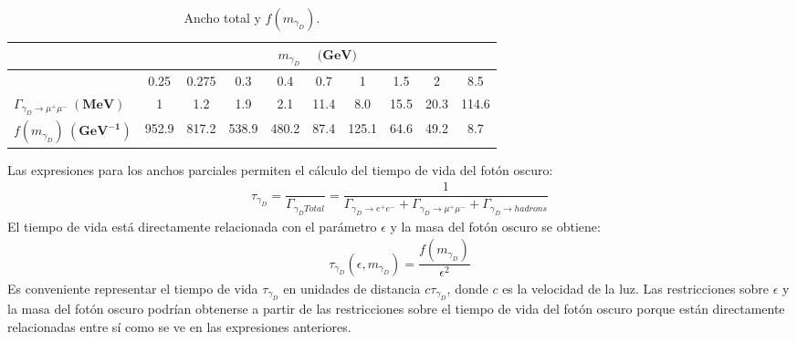 \begin{table}[!ht]
  \begin{center}
    \small
    \begin{tabular}{l|c|c|c|c|c|c|c|c|c} %
		\toprule
		& \multicolumn{9}{c}{$m_{\gamma_D}$ ~ $\mathbf{(GeV})$}\\
		\hline
		& 0.25 & 0.275 & 0.3 & 0.4 & 0.7 & 1 & 1.5 & 2 & 8.5\\
		\midrule
       	$\Gamma_{\gamma_D \rightarrow \mu^+\mu^-} ~ \mathbf{(MeV)}$ & 1 & 1.2 & 1.9 & 2.1 & 11.4 & 8.0 & 15.5 & 20.3 & 114.6 \\
       	\hline 
       	$f(m_{\gamma_D}) ~ \mathbf{(GeV^{-1})}$ & 952.9 & 817.2 & 538.9 & 480.2 & 87.4 & 125.1 & 64.6 & 49.2 & 8.7 \\
      	\bottomrule    
    \end{tabular}
    \caption{Ancho total y $f(m_{\gamma_D})$.}
    \label{an-15-455:tb1}
  \end{center}
\end{table}

Las expresiones para los anchos parciales permiten el cálculo del tiempo de vida del fotón oscuro:
\begin{eqnarray}
\label{an-15-455:ec6}
\tau_{\gamma_D} = \dfrac{}{\Gamma_{\gamma_D Total}} =\dfrac{1}{\Gamma_{\gamma_D \rightarrow e^+ e^-} + \Gamma_{\gamma_D \rightarrow \mu^+ \mu^-} + \Gamma_{\gamma_D \rightarrow hadrons }}
\end{eqnarray}
El tiempo de vida está directamente relacionada con el parámetro $\epsilon$ y la masa del fotón oscuro se obtiene:
\begin{eqnarray}
\label{an-15-455:ec7}
\tau_{\gamma_D}(\epsilon,m_{\gamma_D}) =\dfrac{f(m_{\gamma_D})}{\epsilon^2} 
\end{eqnarray}
Es conveniente representar el tiempo de vida $\tau_{\gamma_D}$ en unidades de distancia $c\tau_{\gamma_D}$, donde $c$ es la velocidad de la luz. %
Las restricciones sobre $\epsilon$ y la masa del fotón oscuro podrían obtenerse a partir de las restricciones sobre el tiempo de vida del fotón oscuro porque están directamente relacionadas entre sí como se ve en las expresiones anteriores.


